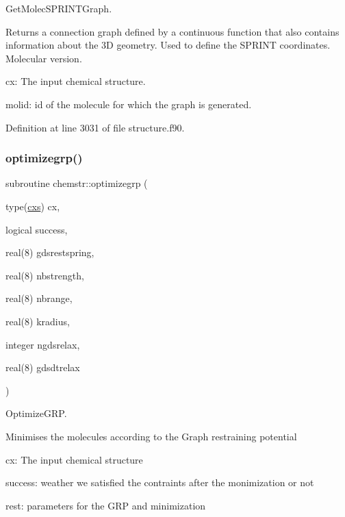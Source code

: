 Get\+Molec\+S\+P\+R\+I\+N\+T\+Graph. 

Returns a connection graph defined by a continuous function that also contains information about the 3D geometry. Used to define the S\+P\+R\+I\+NT coordinates. Molecular version.


\begin{DoxyItemize}
\item cx\+: The input chemical structure.
\item molid\+: id of the molecule for which the graph is generated. 
\end{DoxyItemize}

Definition at line 3031 of file structure.\+f90.

\mbox{\label{namespacechemstr_aa5bcf84cda1282afd18a5ebae91c3fd4}} 
\subsubsection{\texorpdfstring{optimizegrp()}{optimizegrp()}}
{\footnotesize\ttfamily subroutine chemstr\+::optimizegrp (\begin{DoxyParamCaption}\item[{type(\mbox{\hyperlink{structchemstr_1_1cxs}{cxs}})}]{cx,  }\item[{logical}]{success,  }\item[{real(8)}]{gdsrestspring,  }\item[{real(8)}]{nbstrength,  }\item[{real(8)}]{nbrange,  }\item[{real(8)}]{kradius,  }\item[{integer}]{ngdsrelax,  }\item[{real(8)}]{gdsdtrelax }\end{DoxyParamCaption})}



Optimize\+G\+RP. 

Minimises the molecules according to the Graph restraining potential


\begin{DoxyItemize}
\item cx\+: The input chemical structure
\item success\+: weather we satisfied the contraints after the monimization or not
\item rest\+: parameters for the G\+RP and minimization 
\end{DoxyItemize}

